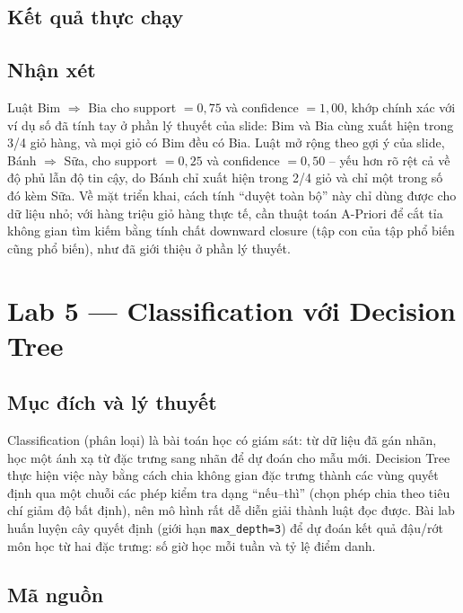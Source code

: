 \documentclass[12pt,a4paper,oneside]{article}
\begin{document}
\subsection{Kết quả thực chạy}



\subsection{Nhận xét}

Luật Bim $\Rightarrow$ Bia cho support $= 0{,}75$ và confidence $= 1{,}00$, khớp chính xác với ví dụ số đã tính tay ở phần lý thuyết của slide: Bim và Bia cùng xuất hiện trong 3/4 giỏ hàng, và mọi giỏ có Bim đều có Bia. Luật mở rộng theo gợi ý của slide, Bánh $\Rightarrow$ Sữa, cho support $= 0{,}25$ và confidence $= 0{,}50$ -- yếu hơn rõ rệt cả về độ phủ lẫn độ tin cậy, do Bánh chỉ xuất hiện trong 2/4 giỏ và chỉ một trong số đó kèm Sữa. Về mặt triển khai, cách tính ``duyệt toàn bộ'' này chỉ dùng được cho dữ liệu nhỏ; với hàng triệu giỏ hàng thực tế, cần thuật toán A-Priori để cắt tỉa không gian tìm kiếm bằng tính chất downward closure (tập con của tập phổ biến cũng phổ biến), như đã giới thiệu ở phần lý thuyết.

\section{Lab 5 --- Classification với Decision Tree}

\subsection{Mục đích và lý thuyết}

Classification (phân loại) là bài toán học có giám sát: từ dữ liệu đã gán nhãn, học một ánh xạ từ đặc trưng sang nhãn để dự đoán cho mẫu mới. Decision Tree thực hiện việc này bằng cách chia không gian đặc trưng thành các vùng quyết định qua một chuỗi các phép kiểm tra dạng ``nếu--thì'' (chọn phép chia theo tiêu chí giảm độ bất định), nên mô hình rất dễ diễn giải thành luật đọc được. Bài lab huấn luyện cây quyết định (giới hạn \texttt{max\_depth=3}) để dự đoán kết quả đậu/rớt môn học từ hai đặc trưng: số giờ học mỗi tuần và tỷ lệ điểm danh.

\subsection{Mã nguồn}
\end{document}
